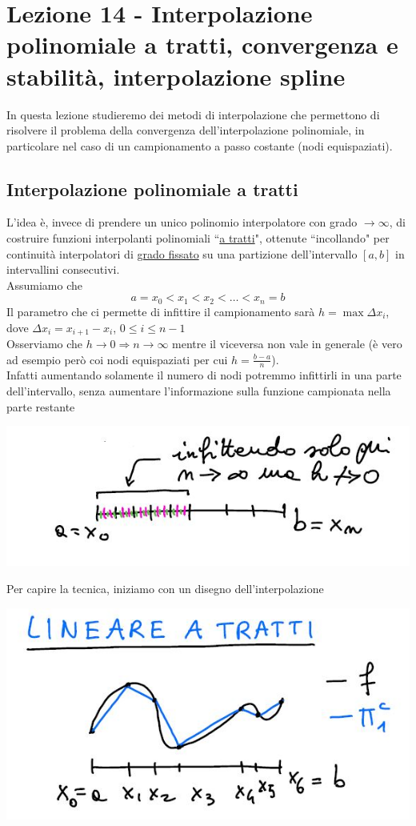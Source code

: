 \documentclass[12pt,a4paper]{article}
\begin{document}
\section[Lezione 14 - Interpolazione polinomiale a tratti]{Lezione 14 - Interpolazione polinomiale a tratti, convergenza e stabilità, interpolazione spline}
In questa lezione studieremo dei metodi di interpolazione che permettono di risolvere il problema della convergenza dell'interpolazione polinomiale, in particolare nel caso di un campionamento a passo costante (nodi equispaziati).

\subsection{Interpolazione polinomiale a tratti}
L'idea è, invece di prendere un unico polinomio interpolatore
con grado $\rightarrow\infty$, di costruire funzioni interpolanti polinomiali ``\uline{a tratti}", ottenute ``incollando" per continuità interpolatori di \uline{grado fissato} su una partizione dell'intervallo $[a,b]$ in intervallini consecutivi.\\ 
Assumiamo che 
\[ a=x_0<x_1<x_2<\dotso<x_n=b \]
Il parametro che ci permette di infittire il campionamento sarà $h=\max\Delta x_i$, dove $\Delta x_i= x_{i+1}-x_i$, $0\leq i\leq n-1$\\
Osserviamo che $h\rightarrow0\Rightarrow n\rightarrow\infty$ mentre il viceversa non vale in generale (è vero ad esempio però coi nodi equispaziati per cui $h=\frac{b-a}{n}$).\\ 
Infatti aumentando solamente il numero di nodi potremmo infittirli in una parte dell'intervallo, senza aumentare l'informazione sulla funzione campionata nella parte restante
\begin{center}
    \includegraphics[scale=0.5]{calcolo.JPG}
\end{center}
Per capire la tecnica, iniziamo con un disegno dell'interpolazione
\begin{center}
    \includegraphics[scale=0.5]{calcolo2.JPG}
\end{center}
\end{document}
